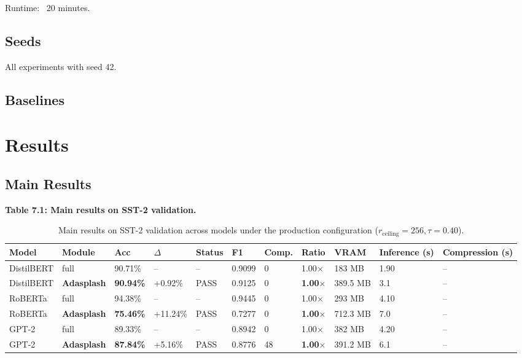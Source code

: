 Runtime: ~20 minutes.

\subsection{Seeds}

All experiments with seed 42.

\subsection{Baselines}



\section{Results}

\subsection{Main Results}

\textbf{Table 7.1: Main results on SST-2 validation.}

\begin{table}[t]
\centering
\small
\begin{tabular}{lllllllllll}
\toprule
\textbf{Model} & \textbf{Module} & \textbf{Acc} & \textbf{$\Delta$} & \textbf{Status} & \textbf{F1} & \textbf{Comp.} & \textbf{Ratio} & \textbf{VRAM} & \textbf{Inference (s)} & \textbf{Compression (s)} \\
\midrule
DistilBERT & full & 90.71\% & -- & -- & 0.9099 & 0 & 1.00$\times$ & 183 MB & 1.90 & -- \\
DistilBERT & \textbf{Adasplash} & \textbf{90.94\%} & +0.92\% & PASS & 0.9125 & 0 & \textbf{1.00$\times$} & 389.5 MB & 3.1 & -- \\
RoBERTa & full & 94.38\% & -- & -- & 0.9445 & 0 & 1.00$\times$ & 293 MB & 4.10 & -- \\
RoBERTa & \textbf{Adasplash} & \textbf{75.46\%} & +11.24\% & PASS & 0.7277 & 0 & \textbf{1.00$\times$} & 712.3 MB & 7.0 & -- \\
GPT-2 & full & 89.33\% & -- & -- & 0.8942 & 0 & 1.00$\times$ & 382 MB & 4.20 & -- \\
GPT-2 & \textbf{Adasplash} & \textbf{87.84\%} & +5.16\% & PASS & 0.8776 & 48 & \textbf{1.00$\times$} & 391.2 MB & 6.1 & -- \\
\bottomrule
\end{tabular}
\caption{Main results on SST-2 validation across models under the production configuration ($r_{\mathrm{ceiling}}=256, \tau=0.40$).}
\label{tab:main_sst2}
\end{table}

